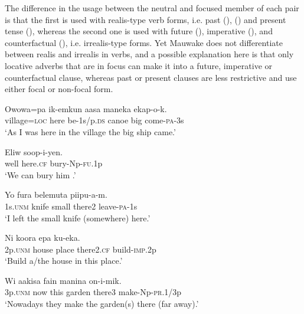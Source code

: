 The difference in the usage between the neutral and focused member of each pair is that the first is  used with realis-type verb forms, i.e. past (), () and present tense (), whereas the second one is  used with future (), imperative (), and counterfactual (), i.e. irrealis-type forms. Yet Mauwake does not differentiate between realis and irrealis in verbs, and a possible explanation here is that only locative adverbs that are in focus can make it into a future, imperative or counterfactual clause, whereas past or present clauses are less restrictive and use either focal or non-focal form. 

\ea%
\label{ex:x463}
\gll Owowa=pa  ik-emkun aasa maneka ekap-o-k. \\
village=\textsc{loc} here be-1s/p.\textsc{ds} canoe big come-\textsc{pa}-3s\\
\glt`As I was here in the village the big ship came.'
\z

\ea%
\label{ex:x464}
\gll Eliw  soop-i-yen. \\
well here.\textsc{cf} bury-Np-\textsc{fu}.1p\\
\glt`We can bury him .'
\z

\ea%
\label{ex:x1213}
\gll Yo fura belemuta  piipu-a-m. \\
1s.\textsc{unm} knife small there2 leave-\textsc{pa}-1s\\
\glt`I left the small knife (somewhere) here.'
\z

\ea%
\label{ex:x465}
\gll Ni koora epa  ku-eka. \\
2p.\textsc{unm} house place there2.\textsc{cf} build-\textsc{imp}.2p\\
\glt`Build a/the house  in this place.'
\z

\ea%
\label{ex:x1214}
\gll Wi aakisa fain manina  on-i-mik. \\
3p.\textsc{unm} now this garden there3 make-Np-\textsc{pr}.1/3p\\
\glt`Nowadays they make the garden(s) there (far away).'
\z

